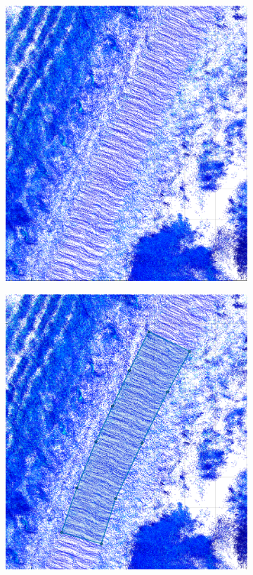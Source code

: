 \documentclass[numbered,pdftex]{ohio-etd}
\begin{document}
{{		\begin{figure}[H]
			\centering
			\begin{subfigure}{0.45\textwidth}
				\centering
				\includegraphics[width=1.0\linewidth]{Defense_Images/pre_select_area}
				\caption[Road area on Point Cloud]{}
				\label{fig:pre_select_area}
			\end{subfigure}
			\begin{subfigure}{0.45\textwidth}
				\centering
				\includegraphics[width=1.0\linewidth]{Defense_Images/area_selected}

\end{subfigure}
\end{figure}}}
\end{document}
